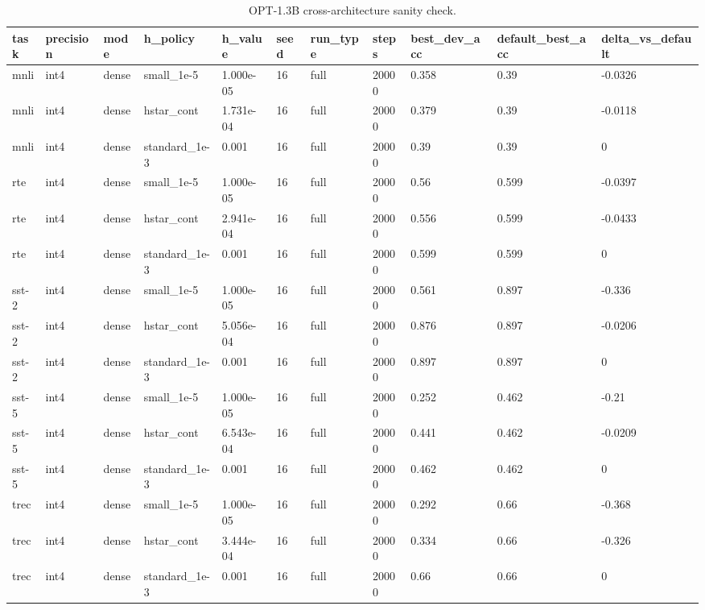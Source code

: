 \begin{table}[t]
\centering
\small
\begin{tabular}{lllllllllll}
\toprule
task & precision & mode & h\_policy & h\_value & seed & run\_type & steps & best\_dev\_acc & default\_best\_acc & delta\_vs\_default \\
\midrule
mnli & int4 & dense & small\_1e-5 & 1.000e-05 & 16 & full & 20000 & 0.358 & 0.39 & -0.0326 \\
mnli & int4 & dense & hstar\_cont & 1.731e-04 & 16 & full & 20000 & 0.379 & 0.39 & -0.0118 \\
mnli & int4 & dense & standard\_1e-3 & 0.001 & 16 & full & 20000 & 0.39 & 0.39 & 0 \\
rte & int4 & dense & small\_1e-5 & 1.000e-05 & 16 & full & 20000 & 0.56 & 0.599 & -0.0397 \\
rte & int4 & dense & hstar\_cont & 2.941e-04 & 16 & full & 20000 & 0.556 & 0.599 & -0.0433 \\
rte & int4 & dense & standard\_1e-3 & 0.001 & 16 & full & 20000 & 0.599 & 0.599 & 0 \\
sst-2 & int4 & dense & small\_1e-5 & 1.000e-05 & 16 & full & 20000 & 0.561 & 0.897 & -0.336 \\
sst-2 & int4 & dense & hstar\_cont & 5.056e-04 & 16 & full & 20000 & 0.876 & 0.897 & -0.0206 \\
sst-2 & int4 & dense & standard\_1e-3 & 0.001 & 16 & full & 20000 & 0.897 & 0.897 & 0 \\
sst-5 & int4 & dense & small\_1e-5 & 1.000e-05 & 16 & full & 20000 & 0.252 & 0.462 & -0.21 \\
sst-5 & int4 & dense & hstar\_cont & 6.543e-04 & 16 & full & 20000 & 0.441 & 0.462 & -0.0209 \\
sst-5 & int4 & dense & standard\_1e-3 & 0.001 & 16 & full & 20000 & 0.462 & 0.462 & 0 \\
trec & int4 & dense & small\_1e-5 & 1.000e-05 & 16 & full & 20000 & 0.292 & 0.66 & -0.368 \\
trec & int4 & dense & hstar\_cont & 3.444e-04 & 16 & full & 20000 & 0.334 & 0.66 & -0.326 \\
trec & int4 & dense & standard\_1e-3 & 0.001 & 16 & full & 20000 & 0.66 & 0.66 & 0 \\
\bottomrule
\end{tabular}
\caption{OPT-1.3B cross-architecture sanity check.}
\label{tab:opt_cross_arch}
\end{table}
